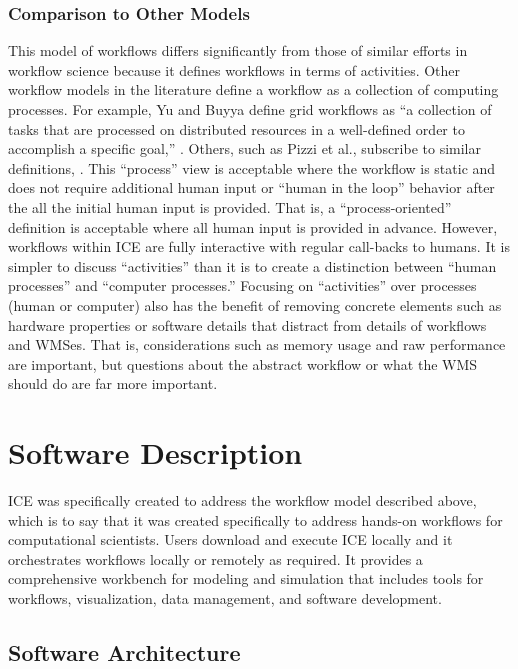 \subsubsection{Comparison to Other
Models}\label{comparison-to-other-models}

This model of workflows differs significantly from those of similar
efforts in workflow science because it defines workflows in terms of
activities. Other workflow models in the literature define a workflow as
a collection of computing processes. For example, Yu and Buyya define
grid workflows as ``a collection of tasks that are processed on
distributed resources in a well-defined order to accomplish a specific
goal,'' \cite{yu_taxonomy_2005}. Others, such as Pizzi et al., subscribe to
similar definitions, \cite{pizzi_aiida:_2016}. This ``process'' view is
acceptable where the workflow is static and does not require additional
human input or ``human in the loop'' behavior after the all the initial
human input is provided. That is, a ``process-oriented'' definition is
acceptable where all human input is provided in advance. However,
workflows within ICE are fully interactive with regular call-backs to
humans. It is simpler to discuss ``activities'' than it is to create a
distinction between ``human processes'' and ``computer processes.''
Focusing on ``activities'' over processes (human or computer) also has
the benefit of removing concrete elements such as hardware properties or
software details that distract from details of workflows and WMSes. That
is, considerations such as memory usage and raw performance are
important, but questions about the abstract workflow or what the WMS
should do are far more important.

\section{Software Description}\label{software-description}

ICE was specifically created to address the workflow model described
above, which is to say that it was created specifically to address
hands-on workflows for computational scientists. Users download and
execute ICE locally and it orchestrates workflows locally or remotely as
required. It provides a comprehensive workbench for modeling and
simulation that includes tools for workflows, visualization, data
management, and software development.

\subsection{Software Architecture}\label{software-architecture}

